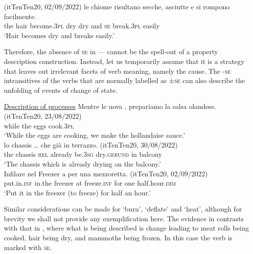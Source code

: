\documentclass[output=paper,colorlinks,citecolor=brown
]{langscibook}
\begin{document}
\hspace*{\fill}(itTenTen20, 02/09/2022)\quad
\ea \label{bentley_example_23}
    \gll  {\ldots}  le		chiome risultano				secche,	asciutte e				si 		rompono facilmente.\\
    {} the	hair				become.3\textsc{pl}	dry					dry					and	\textsc{se}		break.3\textsc{pl}	easily \\
    \glt ‘Hair becomes dry and breaks easily.’ 
\z

Therefore, the absence of \textsc{se} in — cannot be the spell-out of a property description construction. Instead, let us temporarily assume that it is a strategy that leaves out irrelevant facets of verb meaning, namely the cause. 
The -\textsc{se} intransitives of the verbs that are normally labelled as ±\textsc{se} can also describe the unfolding of events of change of state. 

\ea \label{bentley_example_24}
    \underline{Description of processes} 
    \ea \label{bentley_example_24a}
    \gll Mentre	le			uova	, { prepariamo la salsa olandese. (itTenTen20, 23/08/2022)} \\
    while			the		eggs		cook.3\textsc{pl} {} \\
    \glt ‘While the eggs are cooking, we make the hollandaise sauce.’ \\
    \ex \label{bentley_example_24b}
    \gll  {\ldots}  lo chassis  {\ldots}  che		già 				 				in 	terrazzo. {(itTenTen20, 30/08/2022)}\\
    {} the	chassis	 {}				\textsc{rel}	already	be.3\textsc{sg}	dry.\textsc{gerund}	in		balcony	{} \\
    \glt 	‘The chassis which is already drying on the balcony.’ \\
    \ex \label{bentley_example_24c}
    \gll Infilare			nel			Freezer	a				per 	una	mezzoretta. {(itTenTen20, 02/09/2022)}\\
    put.in.\textsc{inf}		in.the	freezer		at	freeze.\textsc{inf}	for		one	half.hour.\textsc{dim}	{} \\
    \glt 					‘Put it in the freezer (to freeze) for half an hour.’ \\
    \z
\z

Similar considerations can be made for  ‘burn’,  ‘deflate’ and  ‘heat’, although for brevity we shall not provide any exemplification here. 
The evidence in  contrasts with that in , where what is being described is change leading to meat rolls being cooked, hair being dry, and mammoths being frozen. In this case the verb is marked with \textsc{se}.
\end{document}
